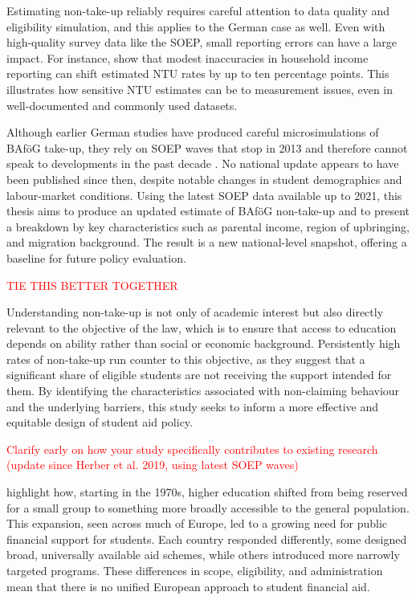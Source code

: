 Estimating non-take-up reliably requires careful attention to data quality and eligibility simulation, and this applies to the German case as well. Even with high-quality survey data like the SOEP, small reporting errors can have a large impact. For instance, \citet{frick_claim_2007} show that modest inaccuracies in household income reporting can shift estimated NTU rates by up to ten percentage points. This illustrates how sensitive NTU estimates can be to measurement issues, even in well-documented and commonly used datasets.

Although earlier German studies have produced careful microsimulations of BAföG take-up, they rely on SOEP waves that stop in 2013 and therefore cannot speak to developments in the past decade \citep{herber_non-take-up_2019, bruckmeier_new_2012}. No national update appears to have been published since then, despite notable changes in student demographics and labour-market conditions. Using the latest SOEP data available up to 2021, this thesis aims to produce an updated estimate of BAföG non-take-up and to present a breakdown by key characteristics such as parental income, region of upbringing, and migration background. The result is a new national-level snapshot, offering a baseline for future policy evaluation.

\textcolor{red}{TIE THIS BETTER TOGETHER}

Understanding non-take-up is not only of academic interest but also directly relevant to the objective of the law, which is to ensure that access to education depends on ability rather than social or economic background. Persistently high rates of non-take-up run counter to this objective, as they suggest that a significant share of eligible students are not receiving the support intended for them. By identifying the characteristics associated with non-claiming behaviour and the underlying barriers, this study seeks to inform a more effective and equitable design of student aid policy.

\textcolor{red}{Clarify early on how your study specifically contributes to existing research (update since Herber et al. 2019, using latest SOEP waves)}


%
%
%
%
\label{section:student-aid-systems}

\cite{schwarz_study_2004} highlight how, starting in the 1970s, higher education shifted from being reserved for a small group to something more broadly accessible to the general population. This expansion, seen across much of Europe, led to a growing need for public financial support for students. Each country responded differently, some designed broad, universally available aid schemes, while others introduced more narrowly targeted programs. These differences in scope, eligibility, and administration mean that there is no unified European approach to student financial aid.


